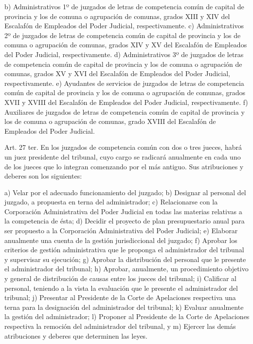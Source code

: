     b) Administrativos 1º de juzgados de letras de competencia común de capital de provincia y los de comuna o agrupación de comunas, grados XIII y XIV del Escalafón de Empleados del Poder Judicial, respectivamente.
    c) Administrativos 2º de juzgados de letras de competencia común de capital de provincia y los de comuna o agrupación de comunas, grados XIV y XV del Escalafón de Empleados del Poder Judicial, respectivamente.
    d) Administrativos 3º de juzgados de letras de competencia común de capital de provincia y los de comuna o agrupación de comunas, grados XV y XVI del Escalafón de Empleados del Poder Judicial, respectivamente.
    e) Ayudantes de servicios de juzgados de letras de competencia común de capital de provincia y los de comuna o agrupación de comunas, grados XVII y XVIII del Escalafón de Empleados del Poder Judicial, respectivamente.
    f) Auxiliares de juzgados de letras de competencia común de capital de provincia y los de comuna o agrupación de comunas, grado XVIII del Escalafón de Empleados del Poder Judicial.

    Art. 27 ter. En los juzgados de competencia común con dos o tres jueces, habrá un juez presidente del tribunal, cuyo cargo se radicará anualmente en cada uno de los jueces que lo integran comenzando por el más antiguo.
    Sus atribuciones y deberes son los siguientes:

    a) Velar por el adecuado funcionamiento del juzgado;
    b) Designar al personal del juzgado, a propuesta en terna del administrador;
    c) Relacionarse con la Corporación Administrativa del Poder Judicial en todas las materias relativas a la competencia de ésta;
    d) Decidir el proyecto de plan presupuestario anual para ser propuesto a la Corporación Administrativa del Poder Judicial;
    e) Elaborar anualmente una cuenta de la gestión jurisdiccional del juzgado;
    f) Aprobar los criterios de gestión administrativa que le proponga el administrador del tribunal y supervisar su ejecución;
    g) Aprobar la distribución del personal que le presente el administrador del tribunal;
    h) Aprobar, anualmente, un procedimiento objetivo y general de distribución de causas entre los jueces del tribunal;
    i) Calificar al personal, teniendo a la vista la evaluación que le presente el administrador del tribunal;
    j) Presentar al Presidente de la Corte de Apelaciones respectiva una terna para la designación del administrador del tribunal;
    k) Evaluar anualmente la gestión del administrador;
    l) Proponer al Presidente de la Corte de Apelaciones respectiva la remoción del administrador del tribunal, y
    m) Ejercer las demás atribuciones y deberes que determinen las leyes.

